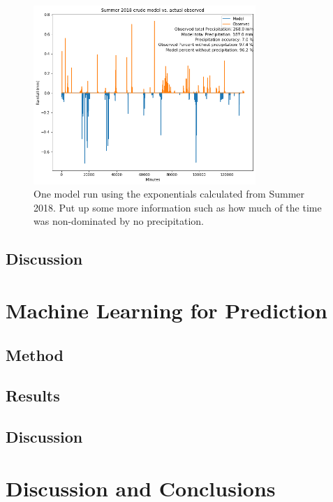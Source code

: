 \documentclass[11pt]{report}
\begin{document}
\begin{figure}[b]
  \centering
  \includegraphics[width=0.75\textwidth]{Figures/run_with_more_info.png}
  \caption[More  run using Summer 2018 climatology]
  {\label{crudesmodel} One model run using the exponentials calculated from
    Summer 2018. Put up some more information such as how much of the time
    was non-dominated by no precipitation.}
\end{figure}
\clearpage

\subsection{Discussion}\label{sec:spc_d}


\section{Machine Learning for Prediction}\label{sec:MLP}






\subsection{Method}

\subsection{Results}

\subsection{Discussion}


\clearpage

\section{Discussion and Conclusions}\label{sec:conclusions}

 

\small
\renewcommand{\bibsep}{0em}

\renewcommand{\bibname}{References}


\end{document}
